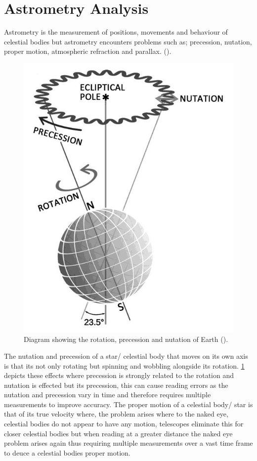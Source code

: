 \documentclass[12pt]{article}
\begin{document}
\section{Astrometry Analysis}
\label{Section 1}

Astrometry is the measurement of positions, movements and behaviour of celestial bodies but astrometry encounters problems such as; precession, nutation, proper motion, atmospheric refraction and parallax. (\cite{ImageProcessingDilemma}). \\

\begin{figure}[H]
\centering
\includegraphics[scale=0.3]{Images/S1/2.png}
\caption{Diagram showing the rotation, precession and nutation of Earth (\cite{RPN}).}
\label{nutation}
\end{figure}

The nutation and precession of a star/ celestial body that moves on its own axis is that its not only rotating but spinning and wobbling alongside its rotation. \cref{nutation} depicts these effects where precession is strongly related to the rotation and nutation is effected but its precession, this can cause reading errors as the nutation and precession vary in time and therefore requires multiple measurements to improve accuracy. The proper motion of a celestial body/ star is that of its true velocity where, the problem arises where to the naked eye, celestial bodies do not appear to have any motion, telescopes eliminate this for closer celestial bodies but when reading at a greater distance the naked eye problem arises again thus requiring multiple measurements over a vast time frame to deuce a celestial bodies proper motion. \\
\end{document}
